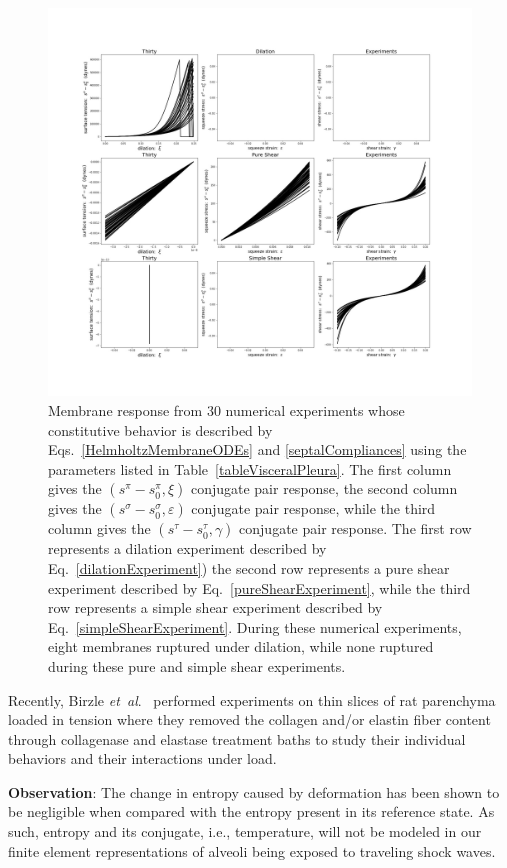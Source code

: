 \begin{figure}
    \mbox{} \hspace{-25mm}
    \includegraphics[width=1.3\textwidth]{figures/septalMembranes.jpg}
    \caption{Membrane response from 30 numerical experiments whose constitutive behavior is described by Eqs.~\ref{HelmholtzMembraneODEs} and \ref{septalCompliances} using the parameters listed in Table~\ref{tableVisceralPleura}. The first column gives the $( s^{\pi} \! - \! s_0^{\pi} , \xi)$ conjugate pair response, the second column gives the $( s^{\sigma} \! - s_0^{\sigma} , \varepsilon)$ conjugate pair response, while the third column gives the $( s^{\tau} \! - \! s_0^{\tau} , \gamma)$ conjugate pair response.  The first row represents a dilation experiment described by Eq.~\ref{dilationExperiment}) the second row represents a pure shear experiment described by Eq.~\ref{pureShearExperiment}, while the third row represents a simple shear experiment described by Eq.~\ref{simpleShearExperiment}.  During these numerical experiments, eight membranes ruptured under dilation, while none ruptured during these pure and simple shear experiments.}
    \label{figStressStrainMembranes}
\end{figure}

Recently, Birzle \textit{et~al}.\ \cite{Birzleetal19} performed experiments on thin slices of rat parenchyma loaded in tension where they removed the collagen and\slash or elastin fiber content through collagenase and elastase treatment baths to study their individual behaviors and their interactions under load.

\textbf{Observation}: The change in entropy caused by deformation has been shown to be negligible when compared with the entropy present in its reference state.  As such, entropy and its conjugate, i.e., temperature, will not be modeled in our finite element representations of alveoli being exposed to traveling shock waves.
